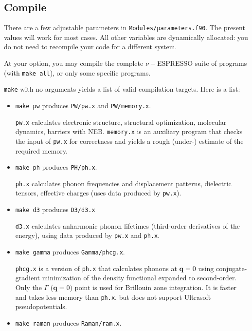 \documentclass[12pt,a4paper]{article}
\begin{document}
\subsection{Compile}

There are a few adjustable parameters in
\texttt{Modules/parameters.f90}.
The present values will work for most cases.  All other variables are
dynamically allocated: you do not need to recompile your code for a
different system.

At your option, you may compile the complete $\nu-$ESPRESSO suite of
programs (with \texttt{make all}), or only some specific programs.

\texttt{make} with no arguments yields a list of valid compilation
targets.
Here is a list:

\begin{itemize}
  \item
    \texttt{make pw} produces \texttt{PW/pw.x} and
    \texttt{PW/memory.x}.

    \texttt{pw.x} calculates electronic structure, structural
    optimization, molecular dynamics, barriers with NEB.
    \texttt{memory.x} is an auxiliary program that checks the input of
    \texttt{pw.x} for correctness and yields a rough (under-) estimate
    of the required memory.
  \item
    \texttt{make ph} produces \texttt{PH/ph.x}.

    \texttt{ph.x} calculates phonon frequencies and displacement
    patterns, dielectric tensors, effective charges (uses data
    produced by \texttt{pw.x}).
  \item
    \texttt{make d3} produces \texttt{D3/d3.x}

    \texttt{d3.x} calculates anharmonic phonon lifetimes (third-order
    derivatives of the energy), using data produced by \texttt{pw.x}
    and \texttt{ph.x}.
  \item
    \texttt{make gamma} produces \texttt{Gamma/phcg.x}.

    \texttt{phcg.x} is a version of \texttt{ph.x} that calculates
    phonons at $\mathbf{q}=0$ using conjugate-gradient minimization of
    the density functional expanded to second-order.
    Only the $\Gamma$ ($\mathbf{q}=0$) point is used for Brillouin
    zone integration.
    It is faster and takes less memory than \texttt{ph.x}, but does
    not support Ultrasoft pseudopotentials.
  \item
    \texttt{make raman} produces \texttt{Raman/ram.x}.


\end{itemize}
\end{document}
